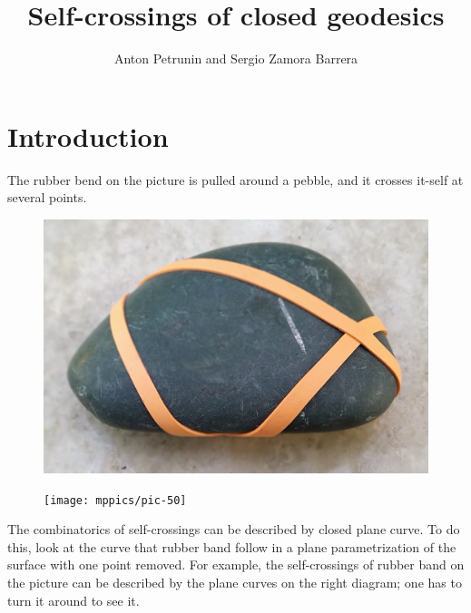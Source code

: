 \documentclass[oneside,a4paper]{amsart}
\begin{document}
\title{Self-crossings of closed geodesics}
\author{Anton Petrunin and Sergio Zamora Barrera}

\maketitle

\section{Introduction}


The rubber bend on the picture is pulled around a pebble,
and it crosses it-self at several points.
\begin{figure}[!ht]
\begin{minipage}{.64\textwidth}
\centering
\includegraphics[width=\textwidth]{pics/pebble.jpg}
\end{minipage}\hfill
\begin{minipage}{.34\textwidth}
\centering
\texttt{[image: mppics/pic-50]}
\end{minipage}
\end{figure}
The combinatorics of self-crossings can be described by  closed plane curve.
To do this, look at the curve that rubber band follow in a plane parametrization of the surface with one point removed.
For example, the self-crossings of rubber band on the picture can be described by the plane curves on the right diagram;
one has to turn it around to see it.
\end{document}
